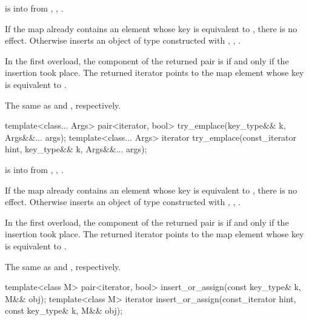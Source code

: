 \begin{itemdescr}
\pnum
\expects
{} is  into 
from , ,
.

\pnum
\effects
If the map already contains an element
whose key is equivalent to ,
there is no effect.
Otherwise inserts an object of type 
constructed with , ,
.

\pnum
\returns
In the first overload,
the  component of the returned pair is 
if and only if the insertion took place.
The returned iterator points to the map element
whose key is equivalent to .

\pnum
\complexity
The same as  and ,
respectively.
\end{itemdescr}

%
\begin{itemdecl}
template<class... Args>
  pair<iterator, bool> try_emplace(key_type&& k, Args&&... args);
template<class... Args>
  iterator try_emplace(const_iterator hint, key_type&& k, Args&&... args);
\end{itemdecl}

\begin{itemdescr}
\pnum
\expects
{} is  into 
from , ,
.

\pnum
\effects
If the map already contains an element
whose key is equivalent to ,
there is no effect.
Otherwise inserts an object of type 
constructed with , ,
.

\pnum
\returns
In the first overload,
the  component of the returned pair is 
if and only if the insertion took place.
The returned iterator points to the map element
whose key is equivalent to .

\pnum
\complexity
The same as  and ,
respectively.
\end{itemdescr}

%
\begin{itemdecl}
template<class M>
  pair<iterator, bool> insert_or_assign(const key_type& k, M&& obj);
template<class M>
  iterator insert_or_assign(const_iterator hint, const key_type& k, M&& obj);
\end{itemdecl}


